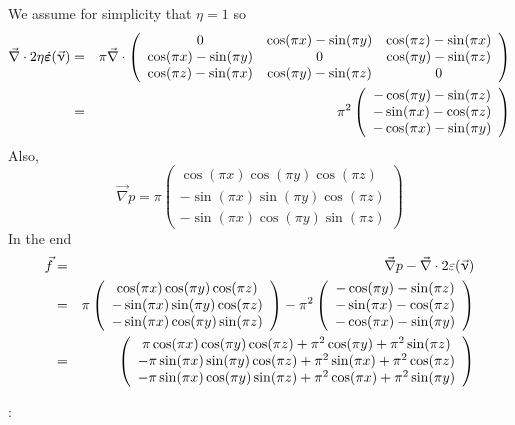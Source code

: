 We assume for simplicity that $\eta=1$ so 
\begin{eqnarray}
\vec\nabla\cdot 2\eta \dot{\bm \varepsilon}(\vec\upnu)
&=&
\pi
\vec\nabla\cdot 
\left(
\begin{array}{ccc}
0 &  \cos (\pi x) -\sin (\pi y)  & \cos (\pi z) -\sin (\pi x)\\
\cos (\pi x) -\sin (\pi y)  & 0 & \cos (\pi y)-\sin (\pi z)  \\
\cos (\pi z) -\sin (\pi x)  &  \cos (\pi y)-\sin (\pi z)  & 0
\end{array}
\right) \nonumber\\
&=& \pi^2
\left(
\begin{array}{ccc}
-\cos (\pi y) -\sin(\pi z) \\
-\sin (\pi x) -\cos(\pi z) \\
-\cos (\pi x) -\sin(\pi y)
\end{array}
\right) 
\end{eqnarray}
Also,
\[
\vec\nabla p = \pi
\left(
\begin{array}{ccc}
\cos (\pi x) \cos(\pi y) \cos (\pi z)\\
-\sin (\pi x) \sin(\pi y) \cos (\pi z)\\
-\sin (\pi x) \cos(\pi y) \sin (\pi z)
\end{array}
\right)
\]
In the end
\begin{eqnarray}
\vec{f} 
&=& \vec\nabla p - \vec\nabla \cdot 2 \varepsilon(\vec\upnu) \nonumber\\
&=& 
\pi
\left(
\begin{array}{ccc}
\cos (\pi x) \cos(\pi y) \cos (\pi z)\\
-\sin (\pi x) \sin(\pi y) \cos (\pi z)\\
-\sin (\pi x) \cos(\pi y) \sin (\pi z)
\end{array}
\right)
-
\pi^2
\left(
\begin{array}{ccc}
-\cos (\pi y) -\sin(\pi z) \\
-\sin (\pi x) -\cos(\pi z) \\
-\cos (\pi x) -\sin(\pi y)
\end{array}
\right)  \nonumber\\
&=& 
\left(
\begin{array}{ccc}
\pi \cos (\pi x) \cos(\pi y) \cos (\pi z) +\pi^2 \cos (\pi y) +\pi^2\sin(\pi z)\\
-\pi\sin (\pi x) \sin(\pi y) \cos (\pi z) +\pi^2 \sin (\pi x) +\pi^2\cos(\pi z)\\
-\pi\sin (\pi x) \cos(\pi y) \sin (\pi z) +\pi^2 \cos (\pi x) +\pi^2\sin(\pi y)
\end{array}
\right) 
\end{eqnarray}

\Literature: 
